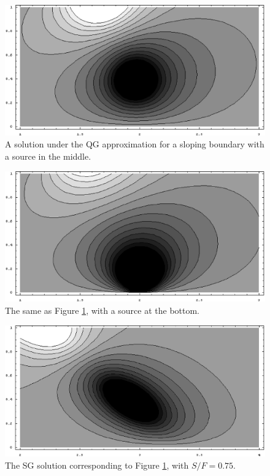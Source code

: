 \documentclass[11pt,onecolumn,oneside]{article}
\begin{document}
\begin{figure}[p]
\includegraphics[width=4.9in]{img/qg_slope_n16_1src_mid.eps}
\caption{\small A solution under the QG approximation for a sloping boundary with a source in the middle.}
\label{Fig:QGSlopeFlowMid}
\end{figure}

\begin{figure}[p]
\includegraphics[width=4.9in]{img/qg_slope_n16_1src_btm.eps}
\caption{\small The same as Figure \ref{Fig:QGSlopeFlowMid}, with a source at the bottom.}
\label{Fig:QGSlopeFlowBtm}
\end{figure}

\begin{figure}[p]
\includegraphics[width=4.9in]{img/sg_slope_n16_s075_1src_mid.eps}
\caption{\small The SG solution corresponding to Figure \ref{Fig:QGSlopeFlowMid}, with $S/F = 0.75$.}
\label{Fig:SGSlopeFlowMid}
\end{figure}
\end{document}
